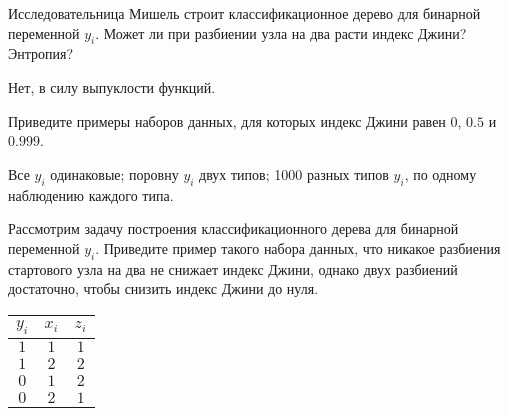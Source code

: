 \begin{problem}
Исследовательница Мишель строит классификационное дерево для бинарной переменной $y_i$. Может ли при разбиении узла на два расти индекс Джини? Энтропия?
\begin{sol}
Нет, в силу выпуклости функций.
\end{sol}
\end{problem}

\begin{problem}
Приведите примеры наборов данных, для которых индекс Джини равен $0$, $0.5$ и $0.999$.
\begin{sol}
Все $y_i$ одинаковые; поровну $y_i$ двух типов; 1000 разных типов $y_i$, по одному наблюдению каждого типа.
\end{sol}
\end{problem}


\begin{problem}
Рассмотрим задачу построения классификационного дерева для бинарной переменной $y_i$. Приведите пример такого набора данных, что никакое разбиения стартового узла на два не снижает индекс Джини, однако двух разбиений достаточно, чтобы снизить индекс Джини до нуля.
\begin{sol}
\begin{tabular}{ccc}
\toprule
$y_i$ & $x_i$ & $z_i$ \\
\midrule
$1$ & $1$ & $1$ \\
$1$ & $2$ & $2$ \\
$0$ & $1$ & $2$ \\
$0$ & $2$ & $1$\\
\bottomrule
\end{tabular}
\end{sol}
\end{problem}



